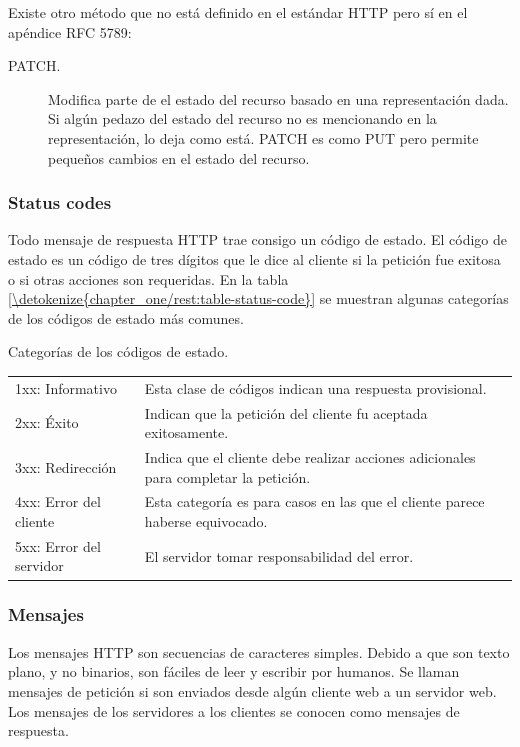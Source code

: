 Existe otro método que no está definido en el estándar HTTP pero sí en
el apéndice RFC 5789:
\begin{description}
\item[{PATCH.}] \leavevmode
Modifica parte de el estado del recurso basado en una representación
dada. Si algún pedazo del estado del recurso no es mencionando en la
representación, lo deja como está. PATCH es como PUT pero permite
pequeños cambios en el estado del recurso.

\end{description}


\subsubsection{Status codes}
\label{\detokenize{chapter_one/rest:status-codes}}
Todo mensaje de respuesta HTTP trae consigo un código de estado. El
código de estado es un código de tres dígitos que le dice al cliente si
la petición fue exitosa o si otras acciones son requeridas. En la
tabla \ref{\detokenize{chapter_one/rest:table-status-code}} se muestran algunas categorías
de los códigos de estado más comunes.


\begin{savenotes}\sphinxattablestart
\centering
{}
\caption{Categorías de los códigos de estado. \label{\detokenize{chapter_one/rest:table-status-code}}}
\sphinxaftercaption
\begin{tabulary}{\linewidth}[t]{|T|T|}
\hline
{}\relax &\relax \\
\hline
1xx: Informativo
&
Esta clase de códigos indican una respuesta provisional.
\\
\hline
2xx: Éxito
&
Indican que la petición del cliente fu aceptada exitosamente.
\\
\hline
3xx: Redirección
&
Indica que el cliente debe realizar acciones adicionales para completar la petición.
\\
\hline
4xx: Error del cliente
&
Esta categoría es para casos en las que el cliente parece haberse equivocado.
\\
\hline
5xx: Error del servidor
&
El servidor tomar responsabilidad del error.
\\
\hline
\end{tabulary}
\par
\sphinxattableend\end{savenotes}


\subsubsection{Mensajes}
\label{\detokenize{chapter_one/rest:mensajes}}
Los mensajes HTTP son secuencias de caracteres simples. Debido a que son
texto plano, y no binarios, son fáciles de leer y escribir por humanos.
Se llaman mensajes de petición si son enviados desde algún cliente web a
un servidor web. Los mensajes de los servidores a los clientes se
conocen como mensajes de respuesta.

